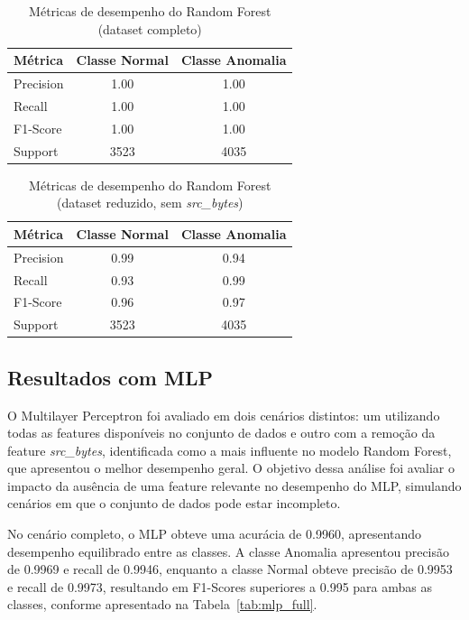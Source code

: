 \begin{table}[ht]
\centering
\caption{Métricas de desempenho do Random Forest (dataset completo)}
\label{tab:rf_metrics_full}
\begin{tabular}{lcc}
\hline
\textbf{Métrica} & \textbf{Classe Normal} & \textbf{Classe Anomalia} \\
\hline
Precision & 1.00 & 1.00 \\
Recall    & 1.00 & 1.00 \\
F1-Score  & 1.00 & 1.00 \\
Support   & 3523 & 4035 \\
\hline
\end{tabular}
\end{table}


\begin{table}[ht]
\centering
\caption{Métricas de desempenho do Random Forest (dataset reduzido, sem \textit{src\_bytes})}
\label{tab:rf_metrics_reduced}
\begin{tabular}{lcc}
\hline
\textbf{Métrica} & \textbf{Classe Normal} & \textbf{Classe Anomalia} \\
\hline
Precision & 0.99 & 0.94 \\
Recall    & 0.93 & 0.99 \\
F1-Score  & 0.96 & 0.97 \\
Support   & 3523 & 4035 \\
\hline
\end{tabular}
\end{table}

\subsection{Resultados com MLP}

O Multilayer Perceptron foi avaliado em dois cenários distintos: um utilizando todas as
features disponíveis no conjunto de dados e outro com a remoção da feature
\textit{src\_bytes}, identificada como a mais influente no modelo Random Forest, que
apresentou o melhor desempenho geral. O objetivo dessa análise foi avaliar o impacto da
ausência de uma feature relevante no desempenho do MLP, simulando cenários em que o
conjunto de dados pode estar incompleto.

No cenário completo, o MLP obteve uma acurácia de 0.9960, apresentando desempenho
equilibrado entre as classes. A classe Anomalia apresentou precisão de 0.9969 e recall
de 0.9946, enquanto a classe Normal obteve precisão de 0.9953 e recall de 0.9973,
resultando em F1-Scores superiores a 0.995 para ambas as classes, conforme apresentado
na Tabela~\ref{tab:mlp_full}.


